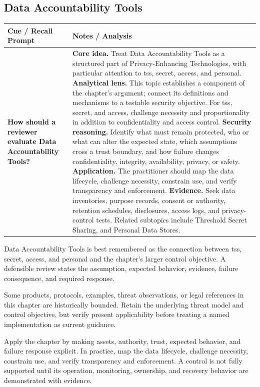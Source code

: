 \documentclass[11pt]{article}
\newcommand{\CornellHeader}{%
\rowcolor{Navy}\color{white}\bfseries Cue / Recall Prompt & \color{white}\bfseries Notes / Analysis\\\hline}
\newcommand{\CornellRow}[2]{%
\cellcolor{CueGray}\RaggedRight\textbf{#1} & \RaggedRight #2\\\hline}
\begin{document}
\subsection*{Data Accountability Tools}
\begin{longtable}{>{\RaggedRight\arraybackslash}p{}|>{\RaggedRight\arraybackslash}p{}}
\CornellHeader
\CornellRow{How should a reviewer evaluate Data Accountability Tools?}{\textbf{Core idea.} Treat Data Accountability Tools as a structured part of Privacy-Enhancing Technologies, with particular attention to tss, secret, access, and personal. \textbf{Analytical lens.} This topic establishes a component of the chapter's argument; connect its definitions and mechanisms to a testable security objective. For tss, secret, and access, challenge necessity and proportionality in addition to confidentiality and access control. \textbf{Security reasoning.} Identify what must remain protected, who or what can alter the expected state, which assumptions cross a trust boundary, and how failure changes confidentiality, integrity, availability, privacy, or safety. \textbf{Application.} The practitioner should map the data lifecycle, challenge necessity, constrain use, and verify transparency and enforcement. \textbf{Evidence.} Seek data inventories, purpose records, consent or authority, retention schedules, disclosures, access logs, and privacy-control tests. Related subtopics include Threshold Secret Sharing, and Personal Data Stores.}
\end{longtable}
\begin{topicsummary}
Data Accountability Tools is best remembered as the connection between tss, secret, access, and personal and the chapter's larger control objective. A defensible review states the assumption, expected behavior, evidence, failure consequence, and required response.
\end{topicsummary}
\begin{historybox}
Some products, protocols, examples, threat observations, or legal references in this chapter are historically bounded. Retain the underlying threat model and control objective, but verify present applicability before treating a named implementation as current guidance.
\end{historybox}
\begin{defensebox}
Apply the chapter by making assets, authority, trust, expected behavior, and failure response explicit. In practice, map the data lifecycle, challenge necessity, constrain use, and verify transparency and enforcement. A control is not fully supported until its operation, monitoring, ownership, and recovery behavior are demonstrated with evidence.
\end{defensebox}
\end{document}
